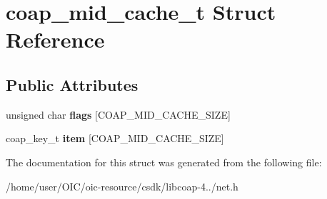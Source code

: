 \hypertarget{structcoap__mid__cache__t}{}\section{coap\+\_\+mid\+\_\+cache\+\_\+t Struct Reference}
\label{structcoap__mid__cache__t}
\subsection*{Public Attributes}
\begin{DoxyCompactItemize}
\item 
\hypertarget{structcoap__mid__cache__t_ae63dccdff392d36c0a58e6c72ed10077}{}unsigned char {\bfseries flags} \mbox{[}C\+O\+A\+P\+\_\+\+M\+I\+D\+\_\+\+C\+A\+C\+H\+E\+\_\+\+S\+I\+Z\+E\mbox{]}\label{structcoap__mid__cache__t_ae63dccdff392d36c0a58e6c72ed10077}

\item 
\hypertarget{structcoap__mid__cache__t_ab6570e68d90a2cfe54c8a54e76783c43}{}coap\+\_\+key\+\_\+t {\bfseries item} \mbox{[}C\+O\+A\+P\+\_\+\+M\+I\+D\+\_\+\+C\+A\+C\+H\+E\+\_\+\+S\+I\+Z\+E\mbox{]}\label{structcoap__mid__cache__t_ab6570e68d90a2cfe54c8a54e76783c43}

\end{DoxyCompactItemize}


The documentation for this struct was generated from the following file\+:\begin{DoxyCompactItemize}
\item 
/home/user/\+O\+I\+C/oic-\/resource/csdk/libcoap-\/4../net.\+h\end{DoxyCompactItemize}
